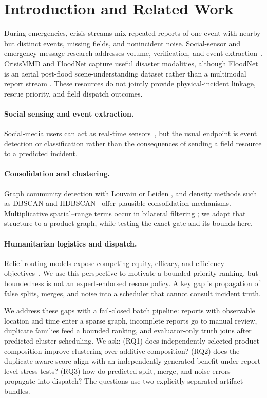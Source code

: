 \documentclass[runningheads]{llncs}
\begin{document}
\section{Introduction and Related Work}

During emergencies, crisis streams mix repeated reports of one event with
nearby but distinct events, missing fields, and nonincident noise. Social-sensor
and emergency-message research addresses volume, verification, and event
extraction~\cite{sakaki2010earthquake}. CrisisMMD and FloodNet capture useful
disaster modalities, although FloodNet is an aerial post-flood
scene-understanding dataset rather than a multimodal report stream
\cite{alam2018crisismmd,rahnemoonfar2021floodnet}. These resources do not
jointly provide physical-incident linkage, rescue priority, and field dispatch
outcomes.

\paragraph{Social sensing and event extraction.}
Social-media users can act as real-time sensors~\cite{sakaki2010earthquake},
but the usual endpoint is event detection or classification rather than the
consequences of sending a field resource to a predicted incident.

\paragraph{Consolidation and clustering.}
Graph community detection with Louvain or Leiden
\cite{blondel2008louvain,traag2019leiden}, and density methods such as DBSCAN
and HDBSCAN~\cite{ester1996dbscan} offer plausible consolidation mechanisms.
Multiplicative spatial--range terms occur in bilateral filtering
\cite{tomasi1998bilateral}; we adapt that structure to a product graph, while
testing the exact gate and its bounds here.

\paragraph{Humanitarian logistics and dispatch.}
Relief-routing models expose competing equity, efficacy, and efficiency
objectives~\cite{gralla2014review}. We use this perspective to motivate a
bounded priority ranking, but boundedness is not an expert-endorsed rescue
policy. A key gap is propagation of false splits, merges, and noise into a
scheduler that cannot consult incident truth.

We address these gaps with a fail-closed batch pipeline: reports with
observable location and time enter a sparse graph, incomplete reports go to
manual review, duplicate families feed a bounded ranking, and evaluator-only
truth joins after predicted-cluster scheduling. We ask: (RQ1) does
independently selected product composition improve clustering over additive
composition? (RQ2) does the duplicate-aware score align with an independently
generated benefit under report-level stress tests? (RQ3) how do predicted
split, merge, and noise errors propagate into dispatch? The questions use two
explicitly separated artifact bundles.
\end{document}
